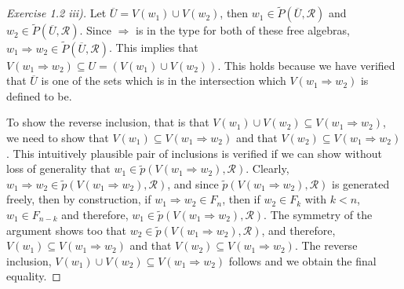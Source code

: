 \documentclass{article}
\theoremstyle{problemstyle}
\begin{document}
\begin{proof}[Exercise 1.2 iii)]
Let $\overline{U} = V(w_1) \cup V(w_2)$, then $w_1 \in \widetilde{P}(\overline{U},\mathscr{R})$ and $w_2 \in \widetilde{P}(\overline{U},\mathscr{R})$. Since $\Rightarrow$ is in the type for both of these free algebras, $w_1 \Rightarrow w_2 \in \widetilde{P}(\overline{U},\mathscr{R})$. This implies that $V(w_1 \Rightarrow w_2) \subseteq U = (V(w_1) \cup V(w_2))$. This holds because we have verified that $\overline{U}$ is one of the sets which is in the intersection which $V(w_1 \Rightarrow w_2)$ is defined to be. 

To show the reverse inclusion, that is that $V(w_1) \cup V(w_2) \subseteq V(w_1 \Rightarrow w_2)$, we need to show that $V(w_1) \subseteq V(w_1 \Rightarrow w_2)$ and that $V(w_2) \subseteq V(w_1 \Rightarrow w_2)$. This intuitively plausible pair of inclusions is verified if we can show without loss of generality that $w_1 \in \widetilde{p}(V(w_1 \Rightarrow w_2), \mathscr{R})$. Clearly, $w_1 \Rightarrow w_2 \in \widetilde{p}(V(w_1 \Rightarrow w_2), \mathscr{R})$, and since $\widetilde{p}(V(w_1 \Rightarrow w_2), \mathscr{R})$ is generated freely, then by construction, if $w_1 \Rightarrow w_2 \in F_n$, then if $w_2 \in F_k$ with $k < n$, $w_1 \in F_{n-k}$ and therefore, $w_1 \in \widetilde{p}(V(w_1 \Rightarrow w_2), \mathscr{R})$. The symmetry of the argument shows too that $w_2 \in \widetilde{p}(V(w_1 \Rightarrow w_2), \mathscr{R})$, and therefore, $V(w_1) \subseteq V(w_1 \Rightarrow w_2)$ and that $V(w_2) \subseteq V(w_1 \Rightarrow w_2)$. The reverse inclusion, $V(w_1) \cup V(w_2) \subseteq V(w_1 \Rightarrow w_2)$ follows and we obtain the final equality. 
\end{proof}
\end{document}
